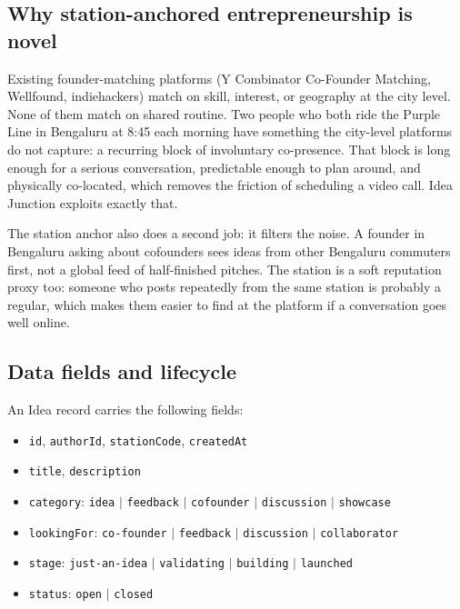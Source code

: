 \documentclass[a4paper,11pt]{article}
\begin{document}
\subsection{Why station-anchored entrepreneurship is novel}

Existing founder-matching platforms (Y Combinator Co-Founder Matching,
Wellfound, indiehackers) match on skill, interest, or geography at the city
level. None of them match on shared routine. Two people who both ride the
Purple Line in Bengaluru at 8:45 each morning have something the city-level
platforms do not capture: a recurring block of involuntary co-presence. That
block is long enough for a serious conversation, predictable enough to plan
around, and physically co-located, which removes the friction of scheduling a
video call. Idea Junction exploits exactly that.

The station anchor also does a second job: it filters the noise. A founder in
Bengaluru asking about cofounders sees ideas from other Bengaluru commuters
first, not a global feed of half-finished pitches. The station is a soft
reputation proxy too: someone who posts repeatedly from the same station is
probably a regular, which makes them easier to find at the platform if a
conversation goes well online.

\subsection{Data fields and lifecycle}

An Idea record carries the following fields:

\begin{itemize}[leftmargin=1.4em, itemsep=2pt, topsep=2pt]
  \item \texttt{id}, \texttt{authorId}, \texttt{stationCode}, \texttt{createdAt}
  \item \texttt{title}, \texttt{description}
  \item \texttt{category}: \texttt{idea} $\mid$ \texttt{feedback} $\mid$ \texttt{cofounder} $\mid$ \texttt{discussion} $\mid$ \texttt{showcase}
  \item \texttt{lookingFor}: \texttt{co-founder} $\mid$ \texttt{feedback} $\mid$ \texttt{discussion} $\mid$ \texttt{collaborator}
  \item \texttt{stage}: \texttt{just-an-idea} $\mid$ \texttt{validating} $\mid$ \texttt{building} $\mid$ \texttt{launched}
  \item \texttt{status}: \texttt{open} $\mid$ \texttt{closed}
\end{itemize}
\end{document}

